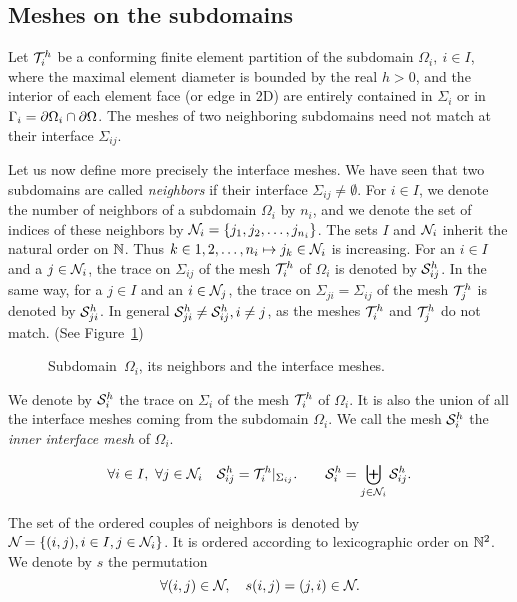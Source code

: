 \subsection{Meshes on the subdomains}
Let $\mathcal{T}^{h}_{i}$ be a conforming finite element partition of the subdomain
$\Omega_i,\ i \in I$, where the maximal element diameter is bounded by the real
$h>0$, and the interior of each element face (or edge in 2D) are entirely
contained in $\Sigma_i$ or in $\Gamma_i = \partial \Omega_i \cap \partial \Omega$.  The
meshes of two neighboring subdomains need not match at their interface
$\Sigma_{ij}$.

Let us now define more precisely the interface meshes. We have seen that two
subdomains are called {\it neighbors} if their interface $\Sigma_{ij} \neq
\emptyset$. For $i \in I$, we denote the number of neighbors of a subdomain
$\Omega_i$ by $n_i$, and we denote the set of indices of these neighbors by
${\mathcal N}_{i} = \{j_1, j_2, \ldots, j_{n_i}\}$. The sets $I$ and ${\mathcal N}_{i}$ inherit
the natural order on ${\mathbb N}$. Thus $k \in {1,2,\ldots, n_i} \mapsto j_k \in
{\mathcal N}_{i}$ is increasing.  For an $i \in I$ and a $j \in {\mathcal N}_{i}$, the trace on
$\Sigma_{ij}$ of the mesh $\mathcal{T}^{h}_{i}$ of $\Omega_{i}$ is denoted by $\mathcal{S}^{h}_{ij}$.  In
the same way, for a $j \in I$ and an $i \in {\mathcal N}_{j}$, the trace on $\Sigma_{ji}
= \Sigma_{ij}$ of the mesh $\mathcal{T}^{h}_{j}$ is denoted by $\mathcal{S}^{h}_{ji}$.  In general
$\mathcal{S}^{h}_{ji} \neq \mathcal{S}^{h}_{ij}, i \neq j$, as the meshes $\mathcal{T}^{h}_{i}$ and $\mathcal{T}^{h}_{j}$ do not
match. (See Figure~\ref{f:dom})

\begin{figure} [htbp]
  \begin{center}
\end{center}
  \caption{Subdomain~$\Omega_i$, its neighbors and the interface meshes.}
  \label{f:dom}
\end{figure}


We denote by $\mathcal{S}^{h}_{i}$ the trace on $\Sigma_{i}$ of the mesh $\mathcal{T}^{h}_{i}$ of
$\Omega_i$.  It is also the union of all the interface meshes coming from the
subdomain $\Omega_i$. We call the mesh $\mathcal{S}^{h}_{i}$ the {\it inner interface mesh}
of $\Omega_i$.

\[
\forall i \in I,\ \forall j \in {\mathcal N}_{i} \quad \mathcal{S}^{h}_{ij} = \mathcal{T}^{h}_{i}|_{\Sigma_{ij}}. 
\qquad \mathcal{S}^{h}_{i} = \biguplus_{j\in {\mathcal N}_{i}} \mathcal{S}^{h}_{ij}. 
\]

The set of the ordered couples of neighbors is denoted by ${\mathcal N}_{} = \{ (i,j), i
\in I, j \in {\mathcal N}_{i}\}$. It is ordered according to lexicographic order on
${\mathbb N}^2$. We denote by $s$ the permutation
\[
\forall (i,j) \in {\mathcal N}_{}, \quad s(i,j) = (j,i) \in {\mathcal N}_{}. 
\]

